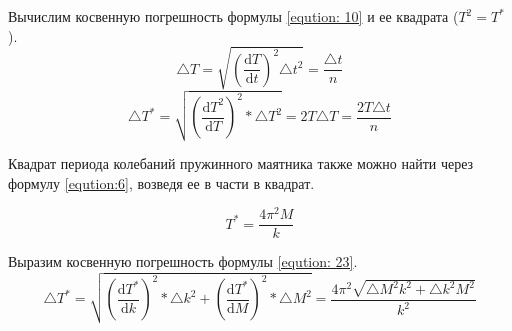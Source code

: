 Вычислим косвенную погрешность формулы \ref{eqution: 10} и ее квадрата ($T^2 = T^*$).
\begin{equation}
	\label{eqution: 11}
	\triangle T = \sqrt{(\frac{\mathrm d T}{\mathrm d t})^2 \triangle t^2} = \frac{\triangle t}{n}
\end{equation}
\begin{equation}
	\label{eqution: 16}
	\triangle T^* = \sqrt{(\frac{\mathrm d T^2}{\mathrm d T})^2 * \triangle T^2} = 2T \triangle T = \frac{2T \triangle t}{n}
\end{equation}

Квадрат периода колебаний пружинного маятника также можно найти через формулу \ref{eqution:6}, возведя ее в части в квадрат.
 
\begin{equation}
	\label{eqution: 23}
	T^* = \frac{4 \pi ^2 M}{k}
\end{equation}

Выразим косвенную погрешность формулы \ref{eqution: 23}.
\begin{equation}
	\label{eqution: 24}
	\triangle T^* = \sqrt{(\frac{\mathrm d T^*}{\mathrm d k})^2 * \triangle k^2 + (\frac{\mathrm d T^*}{\mathrm d M})^2 * \triangle M^2} = \frac{4 \pi ^2 \sqrt{\triangle M^2 k^2 + \triangle k^2 M^2}}{k^2}
\end{equation}

